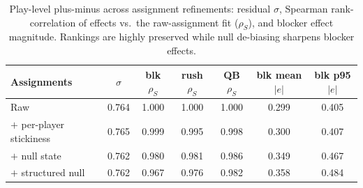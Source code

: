 \begin{table}[h!]
\centering
\footnotesize
\begin{tabular}{lcccccc}
\toprule
Assignments & $\sigma$ & blk $\rho_S$ & rush $\rho_S$ & QB $\rho_S$ & blk mean$|e|$ & blk p95$|e|$ \\
\midrule
Raw & 0.764 & 1.000 & 1.000 & 1.000 & 0.299 & 0.405 \\
$+$ per-player stickiness & 0.765 & 0.999 & 0.995 & 0.998 & 0.300 & 0.407 \\
$+$ null state & 0.762 & 0.980 & 0.981 & 0.986 & 0.349 & 0.467 \\
$+$ structured null & 0.762 & 0.967 & 0.976 & 0.982 & 0.358 & 0.484 \\
\bottomrule
\end{tabular}
\caption{Play-level plus-minus across assignment refinements: residual $\sigma$, Spearman rank-correlation of effects vs.\ the raw-assignment fit ($\rho_S$), and blocker effect magnitude. Rankings are highly preserved while null de-biasing sharpens blocker effects.}
\label{tab:phase_comparison}
\end{table}
